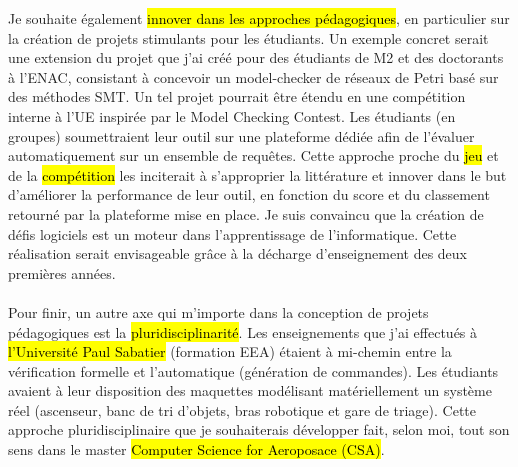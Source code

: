 Je souhaite également \hl{innover dans les approches pédagogiques}, en
particulier sur la création de projets stimulants pour les étudiants. Un exemple
concret serait une extension du projet que j'ai créé pour des étudiants de M2 et
des doctorants à l'ENAC, consistant à concevoir un model-checker de réseaux de
Petri basé sur des méthodes SMT. Un tel projet pourrait être étendu en une
compétition interne à l'UE inspirée par le Model Checking Contest. Les étudiants
(en groupes) soumettraient leur outil sur une plateforme dédiée afin de
l'évaluer automatiquement sur un ensemble de requêtes. Cette approche proche du
\hl{jeu} et de la \hl{compétition} les inciterait à s'approprier la littérature
et innover dans le but d'améliorer la performance de leur outil, en fonction du
score et du classement retourné par la plateforme mise en place. Je suis
convaincu que la création de défis logiciels est un moteur dans l'apprentissage
de l'informatique. Cette réalisation serait envisageable grâce à la décharge
d'enseignement des deux premières années.\\\\


Pour finir, un autre axe qui m'importe dans la conception de projets
pédagogiques est la \hl{pluridisciplinarité}. Les enseignements que j'ai
effectués à \hl{l'Université Paul Sabatier} (formation EEA) étaient à mi-chemin entre
la vérification formelle et l'automatique (génération de commandes). Les
étudiants avaient à leur disposition des maquettes modélisant matériellement un
système réel (ascenseur, banc de tri d'objets, bras robotique et gare de
triage). Cette approche pluridisciplinaire que je souhaiterais développer fait,
selon moi, tout son sens dans le master \hl{Computer Science for Aeroposace (CSA)}.\\